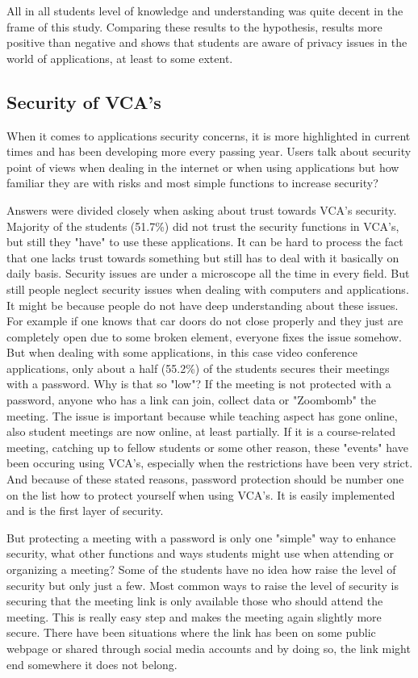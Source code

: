 \documentclass[utf8,english]{gradu3}
\begin{document}
All in all students level of knowledge and understanding was quite decent in the frame of this study. Comparing these results to the hypothesis, results more positive than negative and shows that students are aware of privacy issues in the world of applications, at least to some extent. 


\subsection{Security of VCA's}
When it comes to applications security concerns, it is more highlighted in current times and has been developing more every passing year. Users talk about security point of views when dealing in the internet or when using applications but how familiar they are with risks and most simple functions to increase security?

Answers were divided closely when asking about trust towards VCA's security. Majority of the students (51.7\%) did not trust the security functions in VCA's, but still they "have" to use these applications. It can be hard to process the fact that one lacks trust towards something but still has to deal with it basically on daily basis. Security issues are under a microscope all the time in every field. But still people neglect security issues when dealing with computers and applications. It might be because people do not have deep understanding about these issues. For example if one knows that car doors do not close properly and they just are completely open due to some broken element, everyone fixes the issue somehow. But when dealing with some applications, in this case video conference applications, only about a half (55.2\%) of the students secures their meetings with a password. Why is that so "low"? If the meeting is not protected with a password, anyone who has a link can join, collect data or "Zoombomb" the meeting. The issue is important because while teaching aspect has gone online, also student meetings are now online, at least partially. If it is a course-related meeting, catching up to fellow students or some other reason, these "events" have been occuring using VCA's, especially when the restrictions have been very strict. And because of these stated reasons, password protection should be number one on the list how to protect yourself when using VCA's. It is easily implemented and is the first layer of security.

But protecting a meeting with a password is only one "simple" way to enhance security, what other functions and ways students might use when attending or organizing a meeting?
Some of the students have no idea how raise the level of security but only just a few. Most common ways to raise the level of security is securing that the meeting link is only available those who should attend the meeting. This is really easy step and makes the meeting again slightly more secure. There have been situations where the link has been on some public webpage or shared through social media accounts and by doing so, the link might end somewhere it does not belong.
\end{document}
